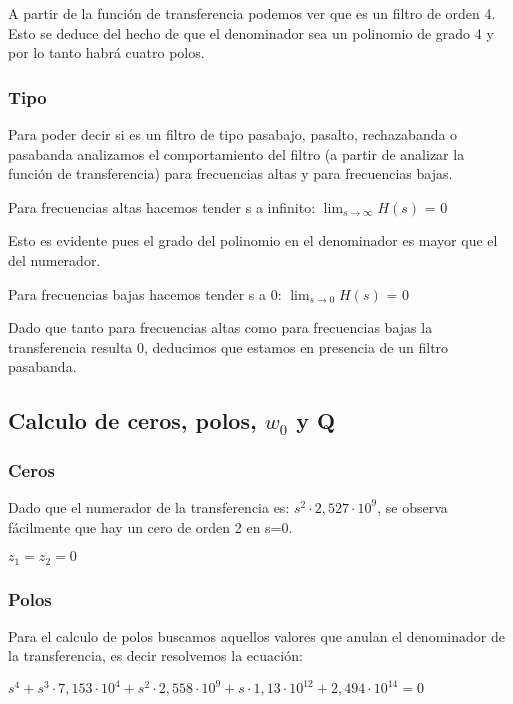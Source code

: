 \documentclass[12pt, titlepage]{article}
\begin{document}
    A partir de la función de transferencia podemos ver que es un filtro de orden 4. Esto se deduce del hecho de que el denominador sea un polinomio de grado 4 y por lo tanto habrá cuatro polos.
    
    \subsubsection{Tipo}
    
    Para poder decir si es un filtro de tipo pasabajo, pasalto, rechazabanda o pasabanda analizamos el comportamiento del filtro (a partir de analizar la función de transferencia) para frecuencias altas y para frecuencias bajas. \vspace{5mm}
    
    Para frecuencias altas hacemos tender s a infinito:  $\lim_{s \to \infty} H(s)$ = 0
    
    Esto es evidente pues el grado del polinomio en el denominador es mayor que el del numerador. \vspace{5mm}
     
    Para frecuencias bajas hacemos tender s a 0: $\lim_{s \to 0} H(s)$ = 0
    
    Dado que tanto para frecuencias altas como para frecuencias bajas la transferencia resulta 0, deducimos que estamos en presencia de un filtro pasabanda. 
    
    \subsection{Calculo de ceros, polos, $w_0$ y Q}
    \subsubsection{Ceros}
    
    Dado que el numerador de la transferencia es: $s^2 \cdot 2,527 \cdot 10^9$, se observa fácilmente que hay un cero de orden 2 en s=0.
    
    \begin{center}
        $z_1 = z_2 = 0$
    \end{center}
    
    \subsubsection{Polos}
    Para el calculo de polos buscamos aquellos valores que anulan el denominador de la transferencia, es decir resolvemos la ecuación:
 \begin{center}
   $ s^4 + s^3 \cdot 7,153 \cdot 10^4 + 
     s^2 \cdot 2,558 \cdot 10^9  +
     s \cdot 1,13\cdot 10^{12} +
     2,494 \cdot 10^{14} = 0$
\end{center}   
\end{document}
